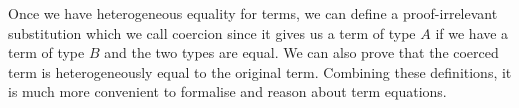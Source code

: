 \documentclass{sig-alternate}
\begin{document}
Once we have heterogeneous equality for terms, we can define a proof-irrelevant substitution which we call coercion
since it gives us a term of type $A$ if we have a term of type $B$ and the
two types are equal. We can also prove that the coerced term is heterogeneously equal to the
original term. Combining these definitions, it is much
more convenient to formalise and reason about term equations.
\end{document}
